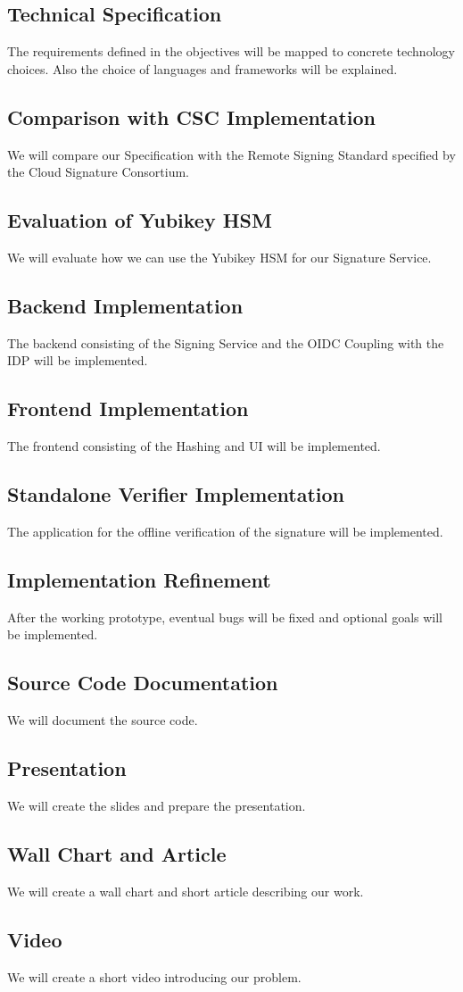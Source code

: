\subsection{Technical Specification}
The requirements defined in the objectives will be mapped to concrete technology choices.
Also the choice of languages and frameworks will be explained.

\subsection{Comparison with CSC Implementation}
We will compare our Specification with the Remote Signing Standard specified by the Cloud Signature Consortium.

\subsection{Evaluation of Yubikey HSM}
We will evaluate how we can use the Yubikey HSM for our Signature Service.

\subsection{Backend Implementation}
The backend consisting of the Signing Service and the OIDC Coupling with the IDP will be implemented.

\subsection{Frontend Implementation}
The frontend consisting of the Hashing and UI will be implemented.

\subsection{Standalone Verifier Implementation}
The application for the offline verification of the signature will be implemented.

\subsection{Implementation Refinement}
After the working prototype, eventual bugs will be fixed and optional goals will be implemented.

\subsection{Source Code Documentation}
We will document the source code.

\subsection{Presentation}
We will create the slides and prepare the presentation.

\subsection{Wall Chart and Article}
We will create a wall chart and short article describing our work.

\subsection{Video}
We will create a short video introducing our problem.
